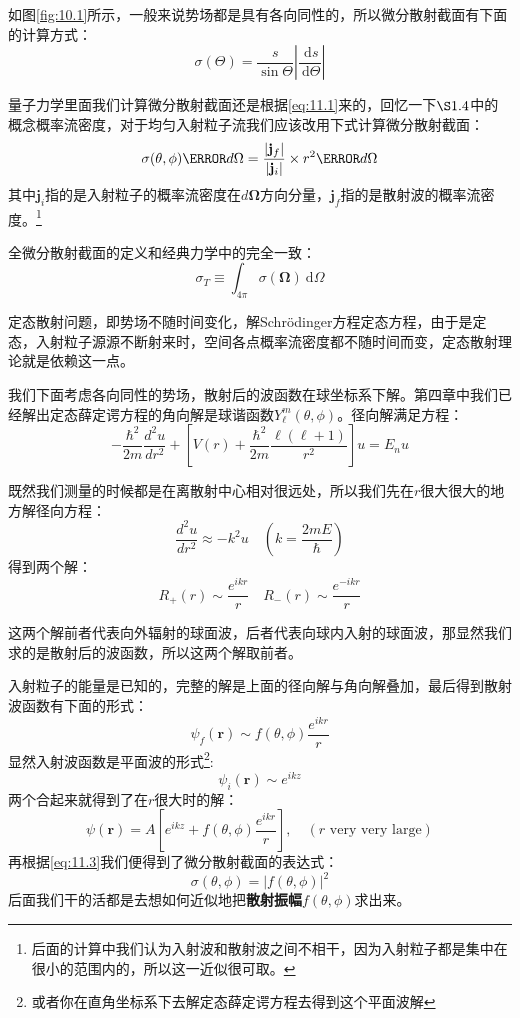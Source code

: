 \documentclass[a4paper,zihao=-4,linespread=1]{ctexrep}
\begin{document}
	如图\ref{fig:10.1}所示，一般来说势场都是具有各向同性的，所以微分散射截面有下面的计算方式：
	\begin{equation}
		\sigma(\Theta)=\frac{s}{\sin\Theta}\left|\frac{\mathrm{~d}s}{\mathrm{~d}\Theta}\right|
	\end{equation}
	
	量子力学里面我们计算微分散射截面还是根据\ref{eq:11.1}来的，回忆一下$\S 1.4$中的概念概率流密度，对于均匀入射粒子流我们应该改用下式计算微分散射截面：
	\begin{equation}
		\label{eq:11.3}	
		\sigma(\theta,\phi) \cancel{d\Omega}	= \frac{\left|\mathbf{j}_f\right|}{\left|\mathbf{j}_i\right|}\times r^2 \cancel{d\Omega}
	\end{equation}
	其中$\mathbf{j}_i$指的是入射粒子的概率流密度在$d\mathbf{\Omega}$方向分量，$\mathbf{j}_f$指的是散射波的概率流密度。\footnote{后面的计算中我们认为入射波和散射波之间不相干，因为入射粒子都是集中在很小的范围内的，所以这一近似很可取。}
	
	全微分散射截面的定义和经典力学中的完全一致：
	\[\sigma_T\equiv \int_{4\pi}\sigma(\mathbf{\Omega})\mathrm{~d}\Omega\]
	
	定态散射问题，即势场不随时间变化，解Schr{\"o}dinger方程定态方程，由于是定态，入射粒子源源不断射来时，空间各点概率流密度都不随时间而变，定态散射理论就是依赖这一点。
	
	我们下面考虑各向同性的势场，散射后的波函数在球坐标系下解。第四章中我们已经解出定态薛定谔方程的角向解是球谐函数$Y_\ell^m(\theta,\phi)$。径向解满足方程：
	\[-\frac{\hbar^2}{2m}\frac{d^2u}{dr^2}+\left[V(r)+\frac{\hbar^2}{2m}\frac{\ell(\ell+1)}{r^2}\right]u=E_n u\]
	
	既然我们测量的时候都是在离散射中心相对很远处，所以我们先在$r$很大很大的地方解径向方程：
	\[\frac{d^2u}{dr^2}\approx -k^2u\quad (k=\frac{2mE}{\hbar})\]
	得到两个解：
	\[R_+(r)\sim \frac{e^{ikr}}{r}\quad R_-(r)\sim \frac{e^{-ikr}}{r}\]
	
	这两个解前者代表向外辐射的球面波，后者代表向球内入射的球面波，那显然我们求的是散射后的波函数，所以这两个解取前者。
	
	入射粒子的能量是已知的，完整的解是上面的径向解与角向解叠加，最后得到散射波函数有下面的形式：
	\[\psi_f(\mathbf{r})\sim f(\theta,\phi)\frac{e^{ikr}}{r}\]
	显然入射波函数是平面波的形式\footnote{或者你在直角坐标系下去解定态薛定谔方程去得到这个平面波解}:
	\[\psi_i(\mathbf{r})\sim e^{ikz}\]
	两个合起来就得到了在$r$很大时的解：
	\begin{equation}
		\label{eq:11.4}
		\psi(\mathbf{r})=A\left[e^{ikz}+f(\theta,\phi)\frac{e^{ikr}}{r}\right],\quad (\text{$r$ very very large})
	\end{equation}
	再根据\ref{eq:11.3}我们便得到了微分散射截面的表达式：
	\begin{equation}
		\boxed{\sigma(\theta,\phi)=\left|f(\theta,\phi)\right|^2}
	\end{equation}
	后面我们干的活都是去想如何近似地把\textbf{散射振幅}$f(\theta,\phi)$求出来。
\end{document}
